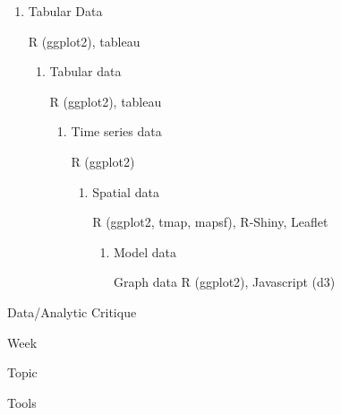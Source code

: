 \documentclass[
]{book}
\begin{document}
\begin{enumerate}
\def\labelenumi{\arabic{enumi}.}
\item
  Tabular Data

  R (ggplot2), tableau

  \begin{enumerate}
  \def\labelenumii{\arabic{enumii}.}
  \setcounter{enumii}{1}
  \item
    Tabular data

    R (ggplot2), tableau

    \begin{enumerate}
    \def\labelenumiii{\arabic{enumiii}.}
    \setcounter{enumiii}{2}
    \item
      Time series data

      R (ggplot2)

      \begin{enumerate}
      \def\labelenumiv{\arabic{enumiv}.}
      \setcounter{enumiv}{3}
      \item
        Spatial data

        R (ggplot2, tmap, mapsf), R-Shiny, Leaflet

        \begin{enumerate}
        \def\labelenumv{\arabic{enumv}.}
        \item
          Model data

          Graph data R (ggplot2), Javascript (d3)
        \end{enumerate}
      \end{enumerate}
    \end{enumerate}
  \end{enumerate}
\end{enumerate}

Data/Analytic Critique

Week

Topic

Tools
\end{document}
